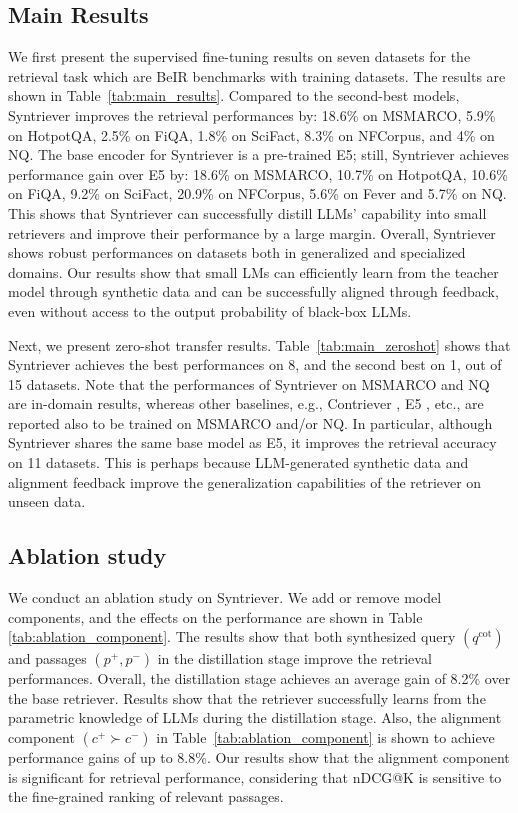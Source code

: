 \subsection{Main Results}
We first present the supervised fine-tuning results on seven datasets for the retrieval task  which are BeIR benchmarks with training datasets. The results are shown in Table~\ref{tab:main_results}.
Compared to the second-best models, Syntriever improves the retrieval performances by: 18.6\% on MSMARCO, 5.9\% on HotpotQA, 2.5\% on FiQA, 1.8\% on SciFact, 8.3\% on NFCorpus, and 4\% on NQ. The base encoder for Syntriever is a pre-trained E5; still, Syntriever achieves performance gain over E5 by: 18.6\% on MSMARCO, 10.7\% on HotpotQA, 10.6\% on FiQA, 9.2\% on SciFact, 20.9\% on NFCorpus, 5.6\% on Fever and 5.7\% on NQ. This shows that Syntriever can successfully distill LLMs' capability into small retrievers and improve their performance by a large margin. Overall, Syntriever shows robust performances on datasets both in generalized and specialized domains. Our results show that small LMs can efficiently learn from the teacher model through synthetic data and can be successfully aligned through feedback, even without access to the output probability of black-box LLMs. 

Next, we present zero-shot transfer results.
Table~\ref{tab:main_zeroshot} shows that Syntriever achieves the best performances on 8, and the second best on 1, out of 15 datasets. Note that the performances of Syntriever on MSMARCO and NQ are in-domain results, whereas other baselines, e.g., Contriever \cite{izacard2021unsupervised}, E5 \cite{wang2022text}, etc., are reported also to be trained on MSMARCO and/or NQ. In particular, although Syntriever shares the same base model as E5, it improves the retrieval accuracy on 11 datasets. This is perhaps because LLM-generated synthetic data and alignment feedback improve the generalization capabilities of the retriever on unseen data.

\subsection{Ablation study}
We conduct an ablation study on Syntriever. We add or remove model components, and the effects on the performance are shown in Table \ref{tab:ablation_component}.
The results show that both synthesized query $(q^\text{cot})$ and passages $(p^+,p^-)$ in the distillation stage improve the retrieval performances. Overall, the distillation stage achieves an average gain of 8.2\% over the base retriever. Results show that the retriever successfully learns from the parametric knowledge of LLMs during the distillation stage. Also, the alignment component $(c^+\succ c^-)$ in Table~\ref{tab:ablation_component} is shown to achieve performance gains of up to 8.8\%. Our results show that the alignment component is significant for retrieval performance, considering that nDCG@K is sensitive to the fine-grained ranking of relevant passages.

